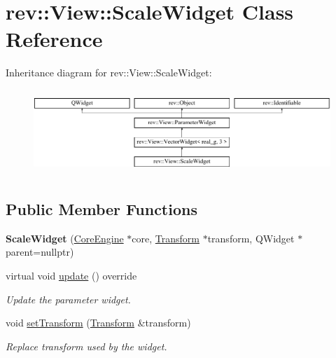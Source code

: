 \hypertarget{classrev_1_1_view_1_1_scale_widget}{}\section{rev\+::View\+::Scale\+Widget Class Reference}
\label{classrev_1_1_view_1_1_scale_widget}
Inheritance diagram for rev\+::View\+::Scale\+Widget\+:\begin{figure}[H]
\begin{center}
\leavevmode
\includegraphics[height=3.232323cm]{classrev_1_1_view_1_1_scale_widget}
\end{center}
\end{figure}
\subsection*{Public Member Functions}
\begin{DoxyCompactItemize}
\item 
\mbox{\label{classrev_1_1_view_1_1_scale_widget_a729b1f79649703710e44482c0143b5ea}} 
{\bfseries Scale\+Widget} (\mbox{\hyperlink{classrev_1_1_core_engine}{Core\+Engine}} $\ast$core, \mbox{\hyperlink{classrev_1_1_transform}{Transform}} $\ast$transform, Q\+Widget $\ast$parent=nullptr)
\item 
\mbox{\label{classrev_1_1_view_1_1_scale_widget_a7c41ef2b4c010fc81f161b4a5ca7734c}} 
virtual void \mbox{\hyperlink{classrev_1_1_view_1_1_scale_widget_a7c41ef2b4c010fc81f161b4a5ca7734c}{update}} () override
\begin{DoxyCompactList}\small\item\em Update the parameter widget. \end{DoxyCompactList}\item 
\mbox{\label{classrev_1_1_view_1_1_scale_widget_a9ebec4798d0fe0ea3e7272d7ed982893}} 
void \mbox{\hyperlink{classrev_1_1_view_1_1_scale_widget_a9ebec4798d0fe0ea3e7272d7ed982893}{set\+Transform}} (\mbox{\hyperlink{classrev_1_1_transform}{Transform}} \&transform)
\begin{DoxyCompactList}\small\item\em Replace transform used by the widget. \end{DoxyCompactList}\end{DoxyCompactItemize}
